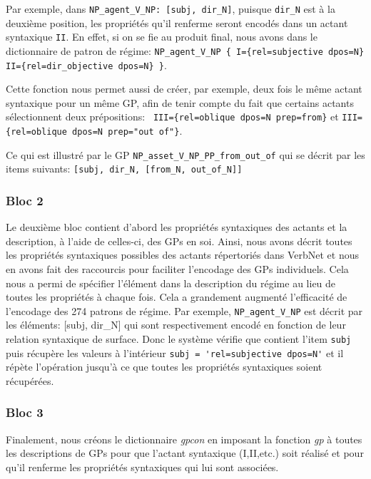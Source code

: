 Par exemple, dans \lstinline|NP_agent_V_NP: [subj, dir_N]|, puisque \texttt{dir\_N} est à la deuxième position, les propriétés qu'il renferme seront encodés dans un actant syntaxique \texttt{II}. En effet, si on se fie au produit final, nous avons dans le dictionnaire de patron de régime: \lstinline|NP_agent_V_NP { I={rel=subjective dpos=N} II={rel=dir_objective dpos=N} }|. 

Cette fonction nous permet aussi de créer, par exemple, deux fois le même actant syntaxique pour un même \ac{GP}, afin de tenir compte du fait que certains actants sélectionnent deux prépositions: \lstinline| III={rel=oblique dpos=N prep=from}| et \lstinline|III={rel=oblique dpos=N prep="out of"}|. 

Ce qui est illustré par le \ac{GP} \lstinline|NP_asset_V_NP_PP_from_out_of| qui se décrit par les items suivants: \lstinline|[subj, dir_N, [from_N, out_of_N]]|

\subsubsection{Bloc 2}

Le deuxième bloc contient d'abord les propriétés syntaxiques des actants et la description, à l'aide de celles-ci, des \acp{GP} en soi. Ainsi, nous avons décrit toutes les propriétés syntaxiques possibles des actants répertoriés dans VerbNet et nous en avons fait des raccourcis pour faciliter l'encodage des \acp{GP} individuels. Cela nous a permi de spécifier l'élément dans la description du régime au lieu de toutes les propriétés à chaque fois. Cela a grandement augmenté l'efficacité de l'encodage des 274 patrons de régime. Par exemple, \lstinline|NP_agent_V_NP| est décrit par les éléments: [subj, dir\_N] qui sont respectivement encodé en fonction de leur relation syntaxique de surface. Donc le système vérifie que contient l'item \texttt{subj} puis récupère les valeurs à l'intérieur \lstinline|subj = 'rel=subjective dpos=N'| et il répète l'opération jusqu'à ce que toutes les propriétés syntaxiques soient récupérées.

\subsubsection{Bloc 3}
Finalement, nous créons le dictionnaire \emph{gpcon} en imposant la fonction \emph{gp} à toutes les descriptions de \acp{GP} pour que l'actant syntaxique (I,II,etc.) soit réalisé et pour qu'il renferme les propriétés syntaxiques qui lui sont associées.

